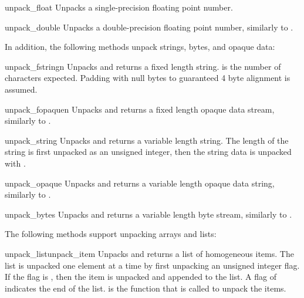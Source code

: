 \begin{funcdesc}{unpack_float}{}
Unpacks a single-precision floating point number.
\end{funcdesc}

\begin{funcdesc}{unpack_double}{}
Unpacks a double-precision floating point number, similarly to
.
\end{funcdesc}

In addition, the following methods unpack strings, bytes, and opaque
data:

\begin{funcdesc}{unpack_fstring}{n}
Unpacks and returns a fixed length string.   is the number of
characters expected.  Padding with null bytes to guaranteed 4 byte
alignment is assumed.
\end{funcdesc}

\begin{funcdesc}{unpack_fopaque}{n}
Unpacks and returns a fixed length opaque data stream, similarly to
.
\end{funcdesc}

\begin{funcdesc}{unpack_string}{}
Unpacks and returns a variable length string.  The length of the
string is first unpacked as an unsigned integer, then the string data
is unpacked with .
\end{funcdesc}

\begin{funcdesc}{unpack_opaque}{}
Unpacks and returns a variable length opaque data string, similarly to
.
\end{funcdesc}

\begin{funcdesc}{unpack_bytes}{}
Unpacks and returns a variable length byte stream, similarly to
.
\end{funcdesc}

The following methods support unpacking arrays and lists:

\begin{funcdesc}{unpack_list}{unpack_item}
Unpacks and returns a list of homogeneous items.  The list is unpacked
one element at a time
by first unpacking an unsigned integer flag.  If the flag is ,
then the item is unpacked and appended to the list.  A flag of
 indicates the end of the list.   is the
function that is called to unpack the items.
\end{funcdesc}

